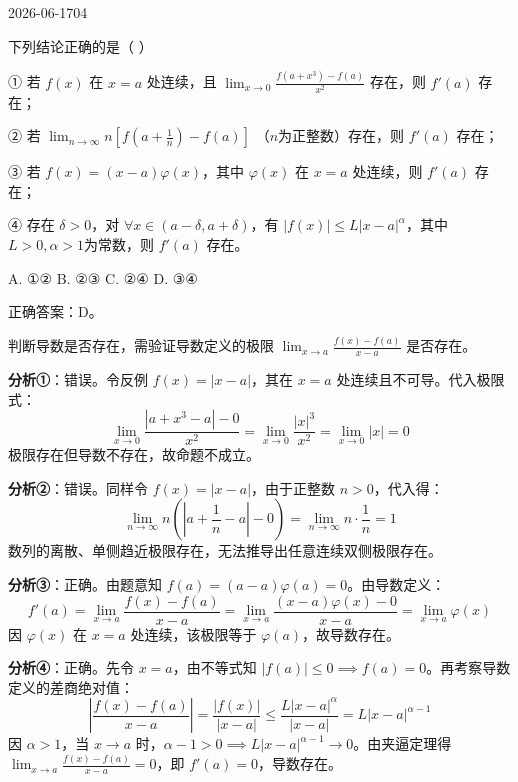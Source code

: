 \begin{mistake}{2026-06-17}{04}

\begin{problemcontent}
下列结论正确的是（ ）

① 若 \(f(x)\) 在 \(x=a\) 处连续，且 \(\lim_{x\to 0} \frac{f(a+x^3)-f(a)}{x^2}\) 存在，则 \(f'(a)\) 存在；

② 若 \(\lim_{n\to\infty} n\left[ f(a+\frac{1}{n}) - f(a) \right]\) （\(n\)为正整数）存在，则 \(f'(a)\) 存在；

③ 若 \(f(x)=(x-a)\varphi(x)\)，其中 \(\varphi(x)\) 在 \(x=a\) 处连续，则 \(f'(a)\) 存在；

④ 存在 \(\delta>0\)，对 \(\forall x \in (a-\delta, a+\delta)\)，有 \(|f(x)| \le L|x-a|^\alpha\)，其中 \(L>0, \alpha>1\)为常数，则 \(f'(a)\) 存在。

A. ①② \quad B. ②③ \quad C. ②④ \quad D. ③④
\end{problemcontent}

\begin{solutioncontent}
正确答案：D。

判断导数是否存在，需验证导数定义的极限 \(\lim_{x\to a} \frac{f(x)-f(a)}{x-a}\) 是否存在。

\textbf{分析①}：错误。令反例 \(f(x)=|x-a|\)，其在 \(x=a\) 处连续且不可导。代入极限式：
\[ \lim_{x\to 0} \frac{|a+x^3-a|-0}{x^2} = \lim_{x\to 0} \frac{|x|^3}{x^2} = \lim_{x\to 0} |x| = 0 \]
极限存在但导数不存在，故命题不成立。

\textbf{分析②}：错误。同样令 \(f(x)=|x-a|\)，由于正整数 \(n>0\)，代入得：
\[ \lim_{n\to\infty} n\left( \left|a+\frac{1}{n}-a\right|-0 \right) = \lim_{n\to\infty} n \cdot \frac{1}{n} = 1 \]
数列的离散、单侧趋近极限存在，无法推导出任意连续双侧极限存在。

\textbf{分析③}：正确。由题意知 \(f(a) = (a-a)\varphi(a) = 0\)。由导数定义：
\[ f'(a) = \lim_{x\to a} \frac{f(x)-f(a)}{x-a} = \lim_{x\to a} \frac{(x-a)\varphi(x)-0}{x-a} = \lim_{x\to a} \varphi(x) \]
因 \(\varphi(x)\) 在 \(x=a\) 处连续，该极限等于 \(\varphi(a)\)，故导数存在。

\textbf{分析④}：正确。先令 \(x=a\)，由不等式知 \(|f(a)| \le 0 \implies f(a)=0\)。再考察导数定义的差商绝对值：
\[ \left| \frac{f(x)-f(a)}{x-a} \right| = \frac{|f(x)|}{|x-a|} \le \frac{L|x-a|^\alpha}{|x-a|} = L|x-a|^{\alpha-1} \]
因 \(\alpha>1\)，当 \(x\to a\) 时，\(\alpha-1>0 \implies L|x-a|^{\alpha-1} \to 0\)。由夹逼定理得 \(\lim_{x\to a} \frac{f(x)-f(a)}{x-a} = 0\)，即 \(f'(a)=0\)，导数存在。
\end{solutioncontent}


\end{mistake}
